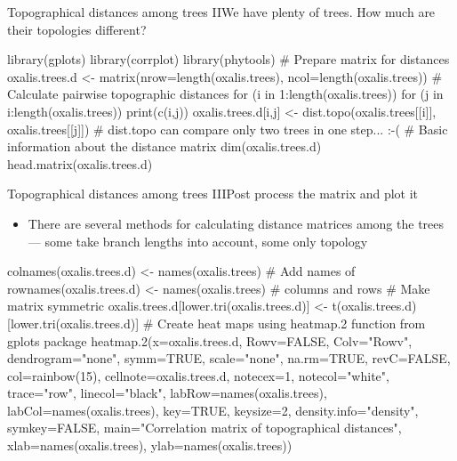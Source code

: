 \documentclass[compress, ucs, xelatex, 11pt, xcolor=svgnames,
	hyperref={
		bookmarks=true,
		unicode=true,
		colorlinks=true,
		pdftitle={Molecular data in R},
		plainpages=false,
		pdfauthor={Vojtech Zeisek},
		pdfsubject={Course about phylogeny and evolution in R},
		pdfcreator={XeLaTeX},
		pdfkeywords={R, evolution, phylogeny, molecular data},
		linkcolor=Tomato,
		anchorcolor=SaddleBrown,
		citecolor=Goldenrod,
		filecolor=DarkMagenta,
		menucolor=Sienna,
		urlcolor=DarkTurquoise,
		pdftex},
	url={hyphens, lowtilde} %
	]{beamer}
\begin{document}
\begin{frame}[fragile]{Topographical distances among trees II}{We have plenty of trees. How much are their topologies different?}
	\begin{spluscode}
    library(gplots)
    library(corrplot)
    library(phytools)
    # Prepare matrix for distances
    oxalis.trees.d <- matrix(nrow=length(oxalis.trees),
      ncol=length(oxalis.trees))
    # Calculate pairwise topographic distances
    for (i in 1:length(oxalis.trees)) {
      for (j in i:length(oxalis.trees)) {
        print(c(i,j))
        oxalis.trees.d[i,j] <- dist.topo(oxalis.trees[[i]],
          oxalis.trees[[j]])
      }
    } # dist.topo can compare only two trees in one step... :-(
    # Basic information about the distance matrix
    dim(oxalis.trees.d)
    head.matrix(oxalis.trees.d)
	\end{spluscode}
\end{frame}

\begin{frame}[fragile]{Topographical distances among trees III}{Post process the matrix and plot it}
	\begin{itemize}
		\item There are several methods for calculating distance matrices among the trees --- some take branch lengths into account, some only topology
	\end{itemize}
	\begin{spluscode}
    colnames(oxalis.trees.d) <- names(oxalis.trees) # Add names of
    rownames(oxalis.trees.d) <- names(oxalis.trees) # columns and rows
    # Make matrix symmetric
    oxalis.trees.d[lower.tri(oxalis.trees.d)] <-
      t(oxalis.trees.d)[lower.tri(oxalis.trees.d)]
    # Create heat maps using heatmap.2 function from gplots package
    heatmap.2(x=oxalis.trees.d, Rowv=FALSE, Colv="Rowv", dendrogram="none",
      symm=TRUE, scale="none", na.rm=TRUE, revC=FALSE, col=rainbow(15),
      cellnote=oxalis.trees.d, notecex=1, notecol="white", trace="row",
      linecol="black", labRow=names(oxalis.trees),
      labCol=names(oxalis.trees), key=TRUE, keysize=2,
      density.info="density", symkey=FALSE, main="Correlation matrix of
      topographical distances", xlab=names(oxalis.trees),
      ylab=names(oxalis.trees))
	\end{spluscode}
\end{frame}
\end{document}
